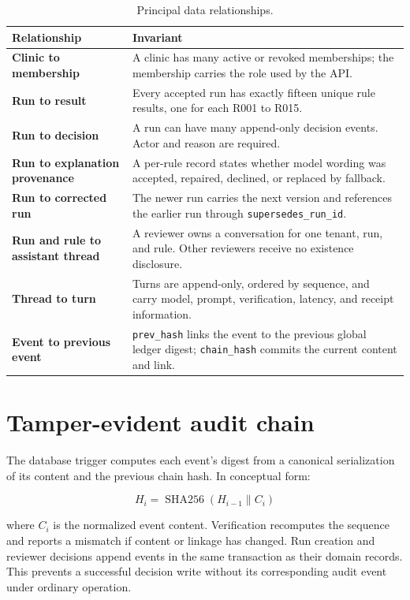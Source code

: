 \documentclass[11pt,a4paper,oneside]{report}
\begin{document}
\begin{table}[H]
\centering
\caption{Principal data relationships.}
\begin{tabularx}{\textwidth}{>{\bfseries}p{42mm} X}
\toprule
Relationship & Invariant\\
\midrule
Clinic to membership & A clinic has many active or revoked memberships; the membership carries the role used by the API.\\
Run to result & Every accepted run has exactly fifteen unique rule results, one for each R001 to R015.\\
Run to decision & A run can have many append-only decision events. Actor and reason are required.\\
Run to explanation provenance & A per-rule record states whether model wording was accepted, repaired, declined, or replaced by fallback.\\
Run to corrected run & The newer run carries the next version and references the earlier run through \texttt{supersedes\_run\_id}.\\
Run and rule to assistant thread & A reviewer owns a conversation for one tenant, run, and rule. Other reviewers receive no existence disclosure.\\
Thread to turn & Turns are append-only, ordered by sequence, and carry model, prompt, verification, latency, and receipt information.\\
Event to previous event & \texttt{prev\_hash} links the event to the previous global ledger digest; \texttt{chain\_hash} commits the current content and link.\\
\bottomrule
\end{tabularx}
\end{table}

\section{Tamper-evident audit chain}
The database trigger computes each event's digest from a canonical serialization of its content and the previous chain hash. In conceptual form:

\[
H_i = \operatorname{SHA256}(H_{i-1} \parallel C_i)
\]

where \(C_i\) is the normalized event content. Verification recomputes the sequence and reports a mismatch if content or linkage has changed. Run creation and reviewer decisions append events in the same transaction as their domain records. This prevents a successful decision write without its corresponding audit event under ordinary operation.
\end{document}
